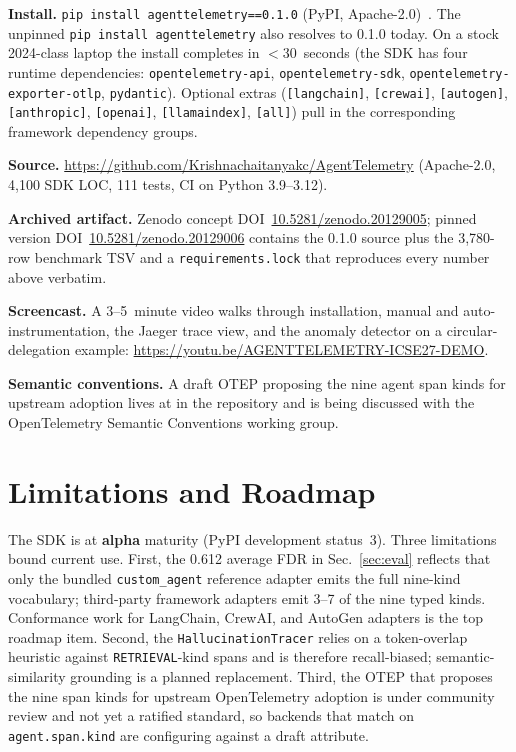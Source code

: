 \documentclass[10pt,conference]{IEEEtran}
\begin{document}
\textbf{Install.} \texttt{pip install agenttelemetry==0.1.0}
(PyPI, Apache-2.0)~\cite{agenttelemetry_pypi}. The unpinned
\texttt{pip install agenttelemetry} also resolves to 0.1.0 today.
On a stock 2024-class laptop the install completes in
$<$30~seconds (the SDK has four runtime dependencies:
\texttt{opentelemetry-api}, \texttt{opentelemetry-sdk},
\texttt{opentelemetry-exporter-otlp}, \texttt{pydantic}). Optional
extras (\texttt{[langchain]}, \texttt{[crewai]}, \texttt{[autogen]},
\texttt{[anthropic]}, \texttt{[openai]}, \texttt{[llamaindex]},
\texttt{[all]}) pull in the corresponding framework dependency
groups.

\textbf{Source.} \url{https://github.com/Krishnachaitanyakc/AgentTelemetry}
(Apache-2.0, 4{,}100 SDK LOC, 111 tests, CI on Python 3.9--3.12).

\textbf{Archived artifact.} Zenodo concept
DOI~\href{https://doi.org/10.5281/zenodo.20129005}{10.5281/zenodo.20129005};
pinned version DOI~\href{https://doi.org/10.5281/zenodo.20129006}{10.5281/zenodo.20129006}
contains the 0.1.0 source plus the 3{,}780-row benchmark TSV and a
\texttt{requirements.lock} that reproduces every number above
verbatim.

\textbf{Screencast.} A 3--5~minute video walks through
installation, manual and auto-instrumentation, the Jaeger trace
view, and the anomaly detector on a circular-delegation example:
\url{https://youtu.be/AGENTTELEMETRY-ICSE27-DEMO}.

\textbf{Semantic conventions.} A draft OTEP proposing the nine
agent span kinds for upstream adoption lives at
 in the repository and
is being discussed with the OpenTelemetry Semantic Conventions
working group.

\section{Limitations and Roadmap}
\label{sec:limits}

The SDK is at \textbf{alpha} maturity (PyPI development status~3).
Three limitations bound current use. First, the 0.612 average FDR
in Sec.~\ref{sec:eval} reflects that only the bundled
\texttt{custom\_agent} reference adapter emits the full nine-kind
vocabulary; third-party framework adapters emit 3--7 of the nine
typed kinds. Conformance work for LangChain, CrewAI, and AutoGen
adapters is the top roadmap item. Second, the
\texttt{HallucinationTracer} relies on a token-overlap
heuristic against \texttt{RETRIEVAL}-kind spans and is therefore
recall-biased; semantic-similarity grounding is a planned
replacement. Third, the OTEP that proposes the nine span kinds
for upstream OpenTelemetry adoption is under community review and
not yet a ratified standard, so backends that match on
\texttt{agent.span.kind} are configuring against a draft attribute.
\end{document}
